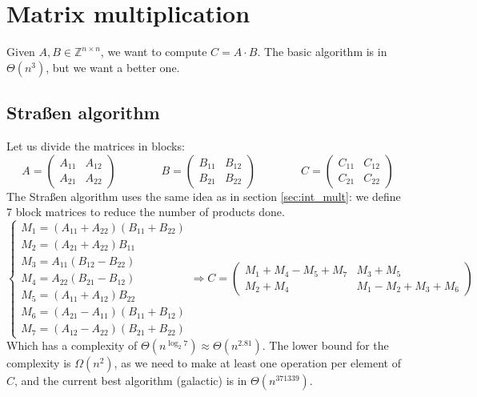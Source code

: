\documentclass[12pt, openany]{report}
\newcommand{\Z}{\mathbb{Z}}
\theoremstyle{definition}
\begin{document}
\section{Matrix multiplication}
Given $A,B\in \Z^{n\times n }$, we want to compute $C = A\cdot B$. The basic algorithm is in $\Theta(n^3)$, but we want a better one. 
\subsection{Straßen algorithm}
Let us divide the matrices in blocks:
\begin{equation}
	A = \begin{pmatrix}
		A_{11} & A_{12} \\ A_{21} & A_{22}
	\end{pmatrix} \qquad \qquad B = \begin{pmatrix}
		B_{11} & B_{12}\\ B_{21} & B_{22}
	\end{pmatrix} \qquad \qquad C = \begin{pmatrix}
		C_{11} & C_{12} \\ C_{21} & C_{22}
	\end{pmatrix}
\end{equation}
The Straßen algorithm uses the same idea as in section \autoref{sec:int_mult}: we define 7 block matrices to reduce the number of products done.
\begin{equation}
	\begin{cases}
		M_1 = (A_{11} + A_{22})(B_{11} + B_{22})\\
		M_2 = (A_{21} + A_{22})B_{11}\\
		M_3 = A_{11}(B_{12} - B_{22})\\
		M_4 = A_{22}(B_{21}-B_{12})\\
		M_5 = (A_{11} + A_{12})B_{22}\\
		M_6 = (A_{21} - A_{11})(B_{11}+B_{12})\\
		M_7 = (A_{12} - A_{22})(B_{21} + B_{22})
	\end{cases}
	\Longrightarrow C = \begin{pmatrix}
		M_1 + M_4 - M_5 + M_7 & M_3 + M_5\\ M_2+M_4 & M_1-M_2+M_3+M_6
	\end{pmatrix}
\end{equation}
Which has a complexity of $\Theta(n^{\log_2 7}) \approx \Theta(n^{2.81})$. The lower bound for the complexity is $\Omega(n^2)$, as we need to make at least one operation per element of $C$, and the current best algorithm (galactic) is in $\Theta(n^{371339})$. 
\end{document}

